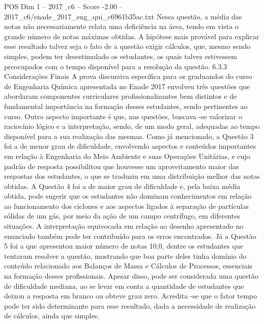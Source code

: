 \begin{textsample}{POS Dim 1 – 2017\_c6 – Score -2.00 – 2017\_c6/enade\_2017\_eng\_qui\_c6961b35ac.txt}
Nessa questão, a média das notas não necessariamente relata uma deficiência na área, tendo em vista o grande número de notas máximas obtidas.
A hipótese mais provável para explicar esse resultado talvez seja o fato de a questão exigir cálculos, que, mesmo sendo simples, podem ter desestimulado os estudantes, os quais talvez estivessem preocupados com o tempo disponível para a resolução da questão. 6.3.3 Considerações Finais A prova discursiva específica para os graduandos do curso de Engenharia Química apresentada no Enade 2017 envolveu três questões que abordaram componentes curriculares profissionalizantes bem distintos e de fundamental importância na formação desses estudantes, sendo pertinentes ao curso.
Outro aspecto importante é que, nas questões, buscava -se valorizar o raciocínio lógico e a interpretação, sendo, de um modo geral, adequadas ao tempo disponível para a sua realização das mesmas.
Como já mencionado, a Questão 3 foi a de menor grau de dificuldade, envolvendo aspectos e conteúdos importantes em relação à Engenharia do Meio Ambiente e suas Operações Unitárias, e cujo padrão de resposta possibilitou que houvesse um aproveitamento maior das respostas dos estudantes, o que se traduziu em uma distribuição melhor das notas obtidas.
A Questão 4 foi a de maior grau de dificuldade e, pela baixa média obtida, pode sugerir que os estudantes não dominam conhecimentos em relação ao funcionamento dos ciclones e aos aspectos ligados à separação de partículas sólidas de um gás, por meio da ação de um campo centrífugo, em diferentes situações.
A interpretação equivocada em relação ao desenho apresentado no enunciado também pode ter contribuído para os erros encontrados.
Já a Questão 5 foi a que apresentou maior número de notas 10,0, dentre os estudantes que tentaram resolver a questão, mostrando que boa parte deles tinha domínio do conteúdo relacionado aos Balanços de Massa e Cálculos de Processos, essenciais na formação desses profissionais.
Apesar disso, pode ser considerada uma questão de dificuldade mediana, ao se levar em conta a quantidade de estudantes que deixou a resposta em branco ou obteve grau zero.
Acredita -se que o fator tempo pode ter sido determinante para esse resultado, dada a necessidade de realização de cálculos, ainda que simples.

\end{textsample}
